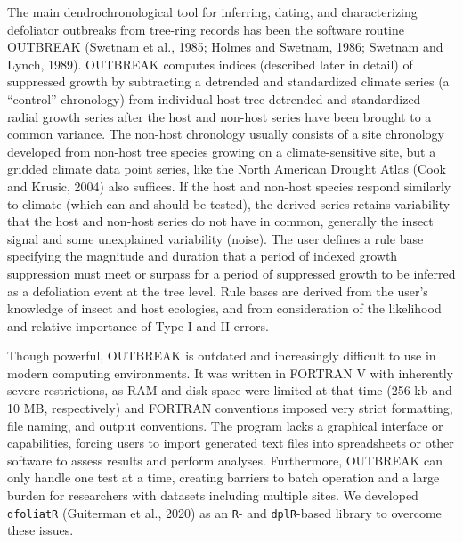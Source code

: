 \documentclass[review]{elsarticle} %
\begin{document}
The main dendrochronological tool for inferring, dating, and characterizing defoliator outbreaks from tree-ring records has been the software routine OUTBREAK (Swetnam et al., 1985; Holmes and Swetnam, 1986; Swetnam and Lynch, 1989). OUTBREAK computes indices (described later in detail) of suppressed growth by subtracting a detrended and standardized climate series (a ``control'' chronology) from individual host-tree detrended and standardized radial growth series after the host and non-host series have been brought to a common variance. The non-host chronology usually consists of a site chronology developed from non-host tree species growing on a climate-sensitive site, but a gridded climate data point series, like the North American Drought Atlas (Cook and Krusic, 2004) also suffices. If the host and non-host species respond similarly to climate (which can and should be tested), the derived series retains variability that the host and non-host series do not have in common, generally the insect signal and some unexplained variability (noise). The user defines a rule base specifying the magnitude and duration that a period of indexed growth suppression must meet or surpass for a period of suppressed growth to be inferred as a defoliation event at the tree level. Rule bases are derived from the user's knowledge of insect and host ecologies, and from consideration of the likelihood and relative importance of Type I and II errors.

Though powerful, OUTBREAK is outdated and increasingly difficult to use in modern computing environments. It was written in FORTRAN V with inherently severe restrictions, as RAM and disk space were limited at that time (256 kb and 10 MB, respectively) and FORTRAN conventions imposed very strict formatting, file naming, and output conventions. The program lacks a graphical interface or capabilities, forcing users to import generated text files into spreadsheets or other software to assess results and perform analyses. Furthermore, OUTBREAK can only handle one test at a time, creating barriers to batch operation and a large burden for researchers with datasets including multiple sites. We developed \texttt{dfoliatR} (Guiterman et al., 2020) as an \texttt{R}- and \texttt{dplR}-based library to overcome these issues.
\end{document}

